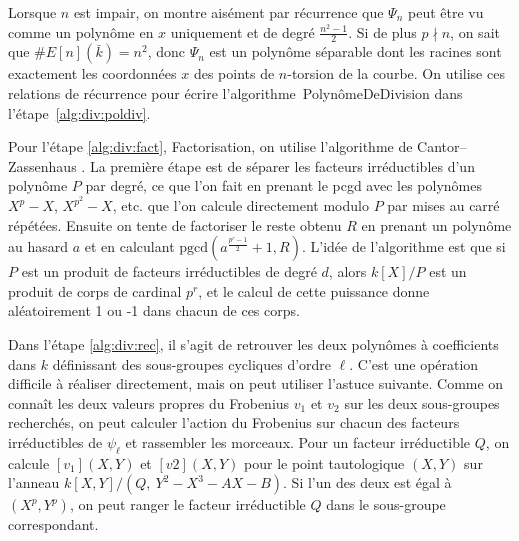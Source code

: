 \documentclass[11pt,a4paper]{article}
\newcommand{\F}{\mathbb{F}}
\renewcommand{\v}{\vspace{5mm}}
\theoremstyle{definition}
\begin{document}
Lorsque $n$ est impair, on montre aisément par récurrence que $\Psi_n$ peut être vu comme un polynôme en $x$ uniquement et de degré $\frac{n^2-1}{2}$. Si de plus $p\nmid n$, on sait que $\#E[n](\bar{k})=n^2$, donc $\Psi_n$ est un polynôme séparable dont les racines sont exactement les coordonnées $x$ des points de $n$-torsion de la courbe. 
On utilise ces relations de récurrence pour écrire l'algorithme~{\sc PolynômeDeDivision} dans l'étape~\ref{alg:div:poldiv}.
\v

Pour l'étape \ref{alg:div:fact}, {\sc Factorisation}, on utilise l'algorithme de Cantor--Zassenhaus \cite{vzGG}. La première étape est de séparer les facteurs irréductibles d'un polynôme $P$ par degré, ce que l'on fait en prenant le pcgd avec les polynômes $X^p - X$, $X^{p^2} - X$, etc. que l'on calcule directement modulo $P$ par mises au carré répétées. Ensuite on tente de factoriser le reste obtenu $R$ en prenant un polynôme au hasard $a$ et en calculant $\mathrm{pgcd}(a^{\frac{p^r - 1}{2}} + 1, R)$. L'idée de l'algorithme est que si $P$ est un produit de facteurs irréductibles de degré $d$, alors $k[X]/P$ est un produit de corps de cardinal $p^r$, et le calcul de cette puissance donne aléatoirement 1 ou -1 dans chacun de ces corps.
\v

Dans l'étape \ref{alg:div:rec}, il s'agit de retrouver les deux polynômes à coefficients dans $k$ définissant des sous-groupes cycliques d'ordre $\ell$. C'est une opération difficile à réaliser directement, mais on peut utiliser l'astuce suivante. Comme on connaît les deux valeurs propres du Frobenius $v_1$ et $v_2$ sur les deux sous-groupes recherchés, on peut calculer l'action du Frobenius sur chacun des facteurs irréductibles de $\psi_\ell$ et rassembler les morceaux. Pour un facteur irréductible $Q$, on calcule $[v_1](X, Y)$ et $[v2](X, Y)$ pour le point tautologique $(X, Y)$ sur l'anneau $k[X, Y]/(Q,\ Y^2 - X^3 - AX - B).$ Si l'un des deux est égal à $(X^p, Y^p)$, on peut ranger le facteur irréductible $Q$ dans le sous-groupe correspondant.
\v
\end{document}
